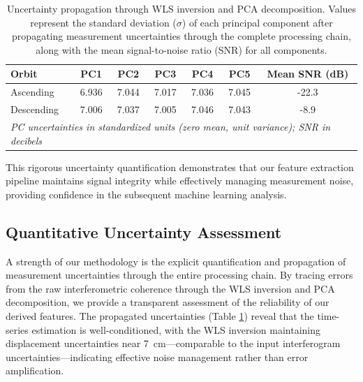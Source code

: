 \begin{table}[htbp]
\centering
\caption{Uncertainty propagation through WLS inversion and PCA decomposition. Values represent the standard deviation ($\sigma$) of each principal component after propagating measurement uncertainties through the complete processing chain, along with the mean signal-to-noise ratio (SNR) for all components.}
\label{tab:uncertainty_propagation}
\begin{tabular}{lcccccc}
\toprule
\textbf{Orbit} & \textbf{PC1} & \textbf{PC2} & \textbf{PC3} & \textbf{PC4} & \textbf{PC5} & \textbf{Mean SNR (dB)} \\
\midrule
Ascending & 6.936 & 7.044 & 7.017 & 7.036 & 7.045 & -22.3 \\
Descending & 7.006 & 7.037 & 7.005 & 7.046 & 7.043 & -8.9 \\
\midrule
\multicolumn{7}{l}{\textit{PC uncertainties in standardized units (zero mean, unit variance); SNR in decibels}} \\
\bottomrule
\end{tabular}
\end{table}

This rigorous uncertainty quantification demonstrates that our feature extraction pipeline maintains signal integrity while effectively managing measurement noise, providing confidence in the subsequent machine learning analysis.


\subsection{Quantitative Uncertainty Assessment}

A strength of our methodology is the explicit quantification and propagation of measurement uncertainties through the entire processing chain. By tracing errors from the raw interferometric coherence through the WLS inversion and PCA decomposition, we provide a transparent assessment of the reliability of our derived features. The propagated uncertainties (Table \ref{tab:uncertainty_propagation}) reveal that the time-series estimation is well-conditioned, with the WLS inversion maintaining displacement uncertainties near 7~cm—comparable to the input interferogram uncertainties—indicating effective noise management rather than error amplification.


